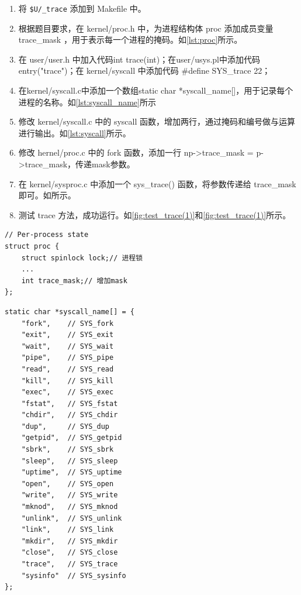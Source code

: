 \begin{enumerate}
	\item 将 \texttt{\$U/\_trace} 添加到 Makefile 中。
	\item 根据题目要求，在 kernel/proc.h 中，为进程结构体 proc 添加成员变量 trace\_mask ，用于表示每一个进程的掩码。如\cref{lst:proc}所示。
	\item 在 user/user.h 中加入代码int trace(int)；在user/usys.pl中添加代码entry("trace")；在 kernel/syscall 中添加代码 \#define SYS\_trace 22；
	\item 在kernel/syscall.c中添加一个数组static char *syscall\_name[]，用于记录每个进程的名称。如\cref{lst:syscall_name}所示
	\item 修改 kernel/syscall.c 中的 syscall 函数，增加两行，通过掩码和编号做与运算进行输出。如\cref{lst:syscall}所示。
	\item 修改 hernel/proc.c 中的 fork 函数，添加一行 np->trace\_mask = p->trace\_mask，传递mask参数。
	\item 在 kernel/sysproc.c 中添加一个 sys\_trace() 函数，将参数传递给 trace\_mask 即可。如所示。
	\item 测试 trace 方法，成功运行。如\cref{fig:test_trace(1)}和\cref{fig:test_trace(1)}所示。
\end{enumerate}

\begin{listing}[!htb]
	\begin{verbatim}
// Per-process state
struct proc {
    struct spinlock lock;// 进程锁
    ...
    int trace_mask;// 增加mask
};
	\end{verbatim}
	\caption{表示进程状态的结构体}\label{lst:proc}
\end{listing}

\begin{listing}[!htb]
	\begin{verbatim}
static char *syscall_name[] = {
    "fork",    // SYS_fork
    "exit",    // SYS_exit
    "wait",    // SYS_wait
    "pipe",    // SYS_pipe
    "read",    // SYS_read
    "kill",    // SYS_kill
    "exec",    // SYS_exec
    "fstat",   // SYS_fstat
    "chdir",   // SYS_chdir
    "dup",     // SYS_dup
    "getpid",  // SYS_getpid
    "sbrk",    // SYS_sbrk
    "sleep",   // SYS_sleep
    "uptime",  // SYS_uptime
    "open",    // SYS_open
    "write",   // SYS_write
    "mknod",   // SYS_mknod
    "unlink",  // SYS_unlink
    "link",    // SYS_link
    "mkdir",   // SYS_mkdir
    "close",   // SYS_close
    "trace",   // SYS_trace
    "sysinfo"  // SYS_sysinfo
};
	\end{verbatim}
	\caption{记录进程名称的数组}\label{lst:syscall_name}
\end{listing}

